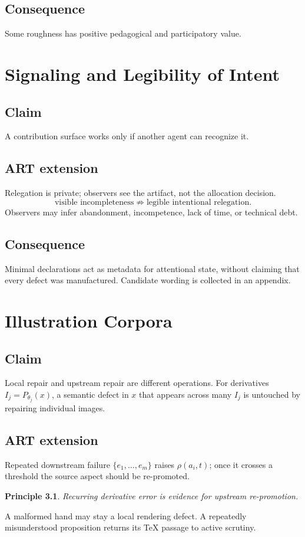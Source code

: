 \documentclass[11pt,openany]{book}
\newtheorem{principle}{Principle}[chapter]
\begin{document}
\section{Consequence}
Some roughness has positive pedagogical and participatory value.

\chapter{Signaling and Legibility of Intent}
\section{Claim}
A contribution surface works only if another agent can recognize it.
\section{ART extension}
Relegation is private; observers see the artifact, not the allocation
decision.
\[
  \text{visible incompleteness}\nRightarrow\text{legible intentional relegation}.
\]
Observers may infer abandonment, incompetence, lack of time, or technical
debt.
\section{Consequence}
Minimal declarations act as metadata for attentional state, without
claiming that every defect was manufactured. Candidate wording is collected
in an appendix.

\chapter{Illustration Corpora}
\section{Claim}
Local repair and upstream repair are different operations. For derivatives
$I_j=P_{\theta_j}(x)$, a semantic defect in $x$ that appears across many
$I_j$ is untouched by repairing individual images.
\section{ART extension}
Repeated downstream failure $\{e_1,\ldots,e_m\}$ raises $\rho(a_i,t)$; once
it crosses a threshold the source aspect should be re-promoted.
\begin{principle}
Recurring derivative error is evidence for upstream re-promotion.
\end{principle}
A malformed hand may stay a local rendering defect. A repeatedly
misunderstood proposition returns its TeX passage to active scrutiny.
\end{document}
